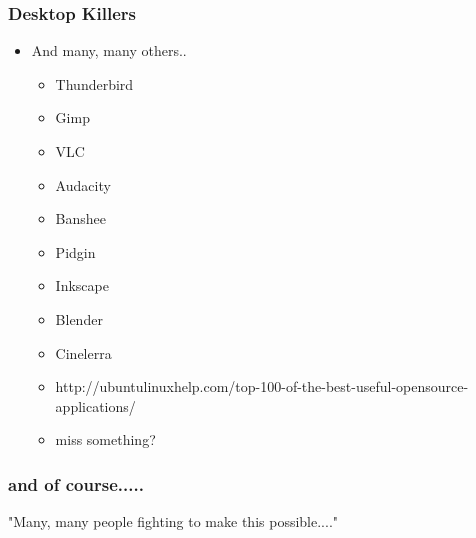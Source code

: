 \documentclass{beamer}
\begin{document}
\begin{frame}
\frametitle{Desktop Killers }

\begin{itemize}
\item And many, many others..
\begin{itemize}
\item Thunderbird
\item Gimp
\item VLC
\item Audacity
\item Banshee
\item Pidgin
\item Inkscape
\item Blender
\item Cinelerra
\item http://ubuntulinuxhelp.com/top-100-of-the-best-useful-opensource-applications/
\item miss something?
\end{itemize}
\end{itemize}

\end{frame}

\begin{frame}
\frametitle{and of course.....}

"Many, many people fighting to make this possible...."

\end{frame}
\end{document}
